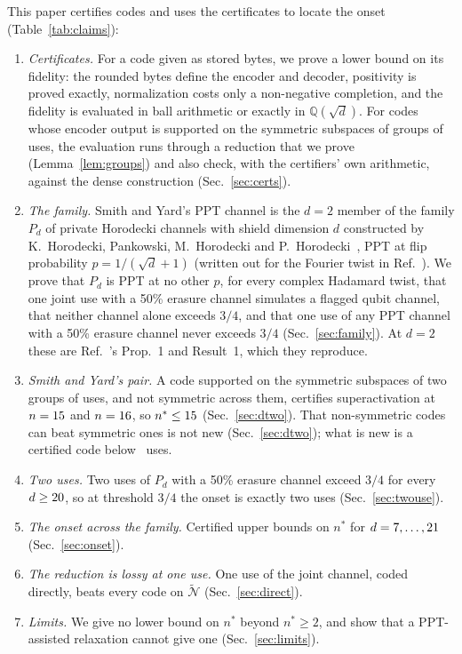\documentclass[aps,pra,twocolumn,superscriptaddress,nofootinbib,longbibliography,floatfix]{revtex4-2}
\newcommand{\nt}{\widetilde{\mathcal N}}
\begin{document}
This paper certifies codes and uses the certificates to locate the onset (Table~\ref{tab:claims}):
\begin{enumerate}
\item \emph{Certificates.} For a code given as stored bytes, we prove a lower bound on its fidelity: the rounded bytes define the encoder and decoder, positivity is proved exactly, normalization costs only a non-negative completion, and the fidelity is evaluated in ball arithmetic or exactly in $\mathbb Q(\sqrt d)$. For codes whose encoder output is supported on the symmetric subspaces of groups of uses, the evaluation runs through a reduction that we prove (Lemma~\ref{lem:groups}) and also check, with the certifiers' own arithmetic, against the dense construction (Sec.~\ref{sec:certs}).
\item \emph{The family.} Smith and Yard's PPT channel is the $d=2$ member of the family $P_d$ of private Horodecki channels with shield dimension $d$ constructed by K.~Horodecki, Pankowski, M.~Horodecki and P.~Horodecki~\cite{horodecki2008low}, PPT at flip probability $p=1/(\sqrt d+1)$ (written out for the Fourier twist in Ref.~\cite{badziag2014bound}). We prove that $P_d$ is PPT at no other $p$, for every complex Hadamard twist, that one joint use with a 50\% erasure channel simulates a flagged qubit channel, that neither channel alone exceeds $3/4$, and that one use of any PPT channel with a 50\% erasure channel never exceeds $3/4$ (Sec.~\ref{sec:family}). At $d=2$ these are Ref.~\cite{parentin2026onset}'s Prop.~1 and Result~1, which they reproduce.
\item \emph{Smith and Yard's pair.} A code supported on the symmetric subspaces of two groups of uses, and not symmetric across them, certifies superactivation at $n=15$ and $n=16$, so $n^*\le15$ (Sec.~\ref{sec:dtwo}). That non-symmetric codes can beat symmetric ones is not new (Sec.~\ref{sec:dtwo}); what is new is a certified code below \PubN\ uses.
\item \emph{Two uses.} Two uses of $P_d$ with a 50\% erasure channel exceed $3/4$ for every $d\ge20$, so at threshold $3/4$ the onset is exactly two uses (Sec.~\ref{sec:twouse}).
\item \emph{The onset across the family.} Certified upper bounds on $n^*$ for $d=7,\dots,21$ (Sec.~\ref{sec:onset}).
\item \emph{The reduction is lossy at one use.} One use of the joint channel, coded directly, beats every code on $\nt$ (Sec.~\ref{sec:direct}).
\item \emph{Limits.} We give no lower bound on $n^*$ beyond $n^*\ge2$, and show that a PPT-assisted relaxation cannot give one (Sec.~\ref{sec:limits}).
\end{enumerate}
\end{document}
